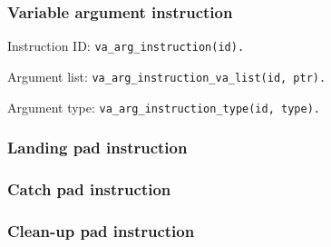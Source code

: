 
\subsubsection{Variable argument instruction}
Instruction ID:
\texttt{va\_arg\_instruction(id).}

\noindent Argument list:
\texttt{va\_arg\_instruction\_va\_list(id, ptr).}

\noindent Argument type:
\texttt{va\_arg\_instruction\_type(id, type).}


\subsubsection{Landing pad instruction}


\subsubsection{Catch pad instruction}


\subsubsection{Clean-up pad instruction}

